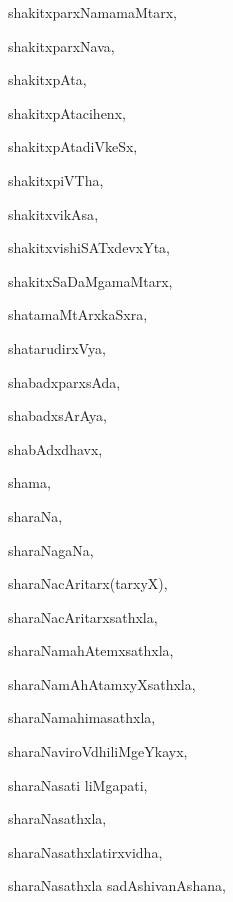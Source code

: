 \begin{multicols}{3}
{\noindent
{shakitxparxNamamaMtarx}, \pageref{shakitxparxNamamaMtarx}

\noindent
{shakitxparxNava}, \pageref{shakitxparxNava}

\noindent
{shakitxpAta}, \pageref{shakitxpAta}

\noindent
{shakitxpAtacihenx}, \pageref{shakitxpAtacihenx}

\noindent
{shakitxpAtadiVkeSx}, \pageref{shakitxpAtadiVkeSx}

\noindent
{shakitxpiVTha}, \pageref{shakitxpiVTha}

\noindent
{shakitxvikAsa}, \pageref{shakitxvikAsa}

\noindent
{shakitxvishiSATxdevxYta}, \pageref{shakitxvishiSATxdevxYta}

\noindent
{shakitxSaDaMgamaMtarx}, \pageref{shakitxSaDaMgamaMtarx}

\noindent
{shatamaMtArxkaSxra}, \pageref{shatamaMtArxkaSxra}

\noindent
{shatarudirxVya}, \pageref{shatarudirxVya}

\noindent
{shabadxparxsAda}, \pageref{shabadxparxsAda}

\noindent
{shabadxsArAya}, \pageref{shabadxsArAya}

\noindent
{shabAdxdhavx}, \pageref{shabAdxdhavx}

\noindent
{shama}, \pageref{shama}

\noindent
{sharaNa}, \pageref{sharaNa}

\noindent
{sharaNagaNa}, \pageref{sharaNagaNa}

\noindent
{sharaNacAritarx(tarxyX)}, \pageref{sharaNacAritarxtarxyX}

\noindent
{sharaNacAritarxsathxla}, \pageref{sharaNacAritarxsathxla}

\noindent
{sharaNamahAtemxsathxla}, \pageref{sharaNamahAtemxsathxla}

\noindent
{sharaNamAhAtamxyXsathxla}, \pageref{sharaNamAhAtamxyXsathxla}

\noindent
{sharaNamahimasathxla}, \pageref{sharaNamahimasathxla}

\noindent
{sharaNaviroVdhiliMgeYkayx}, \pageref{sharaNaviroVdhiliMgeYkayx}

\noindent
{sharaNasati liMgapati}, \pageref{sharaNasatiliMgapati}

\noindent
{sharaNasathxla}, \pageref{sharaNasathxla}

\noindent
{sharaNasathxlatirxvidha}, \pageref{sharaNasathxlatirxvidha}

\noindent
{sharaNasathxla sadAshivanAshana}, \pageref{sharaNasathxla sadAshivanAshana}

}
\end{multicols}
